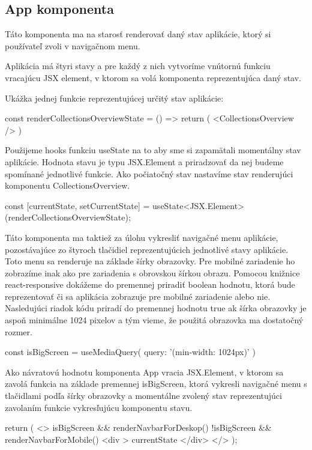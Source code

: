 \subsection*{App komponenta}
Táto komponenta ma na starosť renderovať daný stav aplikácie, ktorý si používateľ zvoli v navigačnom menu. 

Aplikácia má štyri stavy a pre každý z nich vytvoríme vnútornú funkciu vracajúcu JSX element, v ktorom sa volá komponenta reprezentujúca daný stav. 

Ukážka jednej funkcie reprezentujúcej určitý stav aplikácie:
\begin{code}
const renderCollectionsOverviewState = () => {
      return (
            <CollectionsOverview />
      )
}
\end{code}

Použijeme hooks funkciu useState na to aby sme si zapamätali momentálny stav aplikácie. Hodnota stavu je typu JSX.Element a priradzovať da nej budeme spomínané jednotlivé funkcie. 
Ako počiatočný stav nastavíme stav renderujúci komponentu CollectionsOverview. 

\begin{code}
      const [currentState, setCurrentState] = useState<JSX.Element>(renderCollectionsOverviewState);
\end{code}

Táto komponenta ma taktiež za úlohu vykresliť navigačné menu aplikácie, pozostávajúce zo štyroch tlačidiel reprezentujúcich jednotlivé stavy aplikácie. 
Toto menu sa renderuje na základe šírky obrazovky. Pre mobilné zariadenie ho zobrazíme inak ako pre zariadenia s obrovskou šírkou obrazu. 
Pomocou knižnice react-responsive dokážeme do premennej priradiť boolean hodnotu, ktorá bude reprezentovať či sa aplikácia zobrazuje pre mobilné zariadenie alebo nie. 
Nasledujúci riadok kódu priradí do premennej hodnotu true ak šírka obrazovky je aspoň minimálne 1024 pixelov a tým vieme, že použitá obrazovka ma dostatočný rozmer. 
\begin{code}
const isBigScreen = useMediaQuery({ query: '(min-width: 1024px)' })
\end{code}


Ako návratovú hodnotu komponenta App vracia JSX.Element, v ktorom sa zavolá funkcia na základe premennej isBigScreen,
ktorá vykresli navigačné menu s tlačidlami podľa šírky obrazovky a momentálne zvolený stav reprezentujúci zavolaním funkcie vykresľujúcu komponentu stavu. 
\begin{code}
return (
      <>
            {isBigScreen && renderNavbarForDeskop()}
            {!isBigScreen && renderNavbarForMobile()}
            <div >
            {currentState}
            </div>
      </>
);
\end{code}

